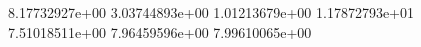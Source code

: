 8.17732927e+00
 3.03744893e+00
 1.01213679e+00
 1.17872793e+01
 7.51018511e+00
 7.96459596e+00
 7.99610065e+00
